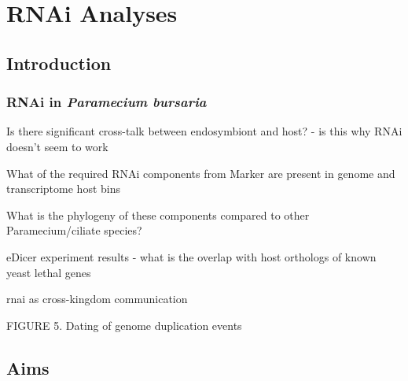 \graphicspath{{chapters/7.Chapter_5/figures}}

\chapter{RNAi Analyses}


\section{Introduction}

\subsection{RNAi in \textit{Paramecium bursaria}}



Is there significant cross-talk between endosymbiont and host? - is this why RNAi doesn't seem to work

What of the required RNAi components from Marker are present in genome and transcriptome host bins

What is the phylogeny of these components compared to other Paramecium/ciliate species?

eDicer experiment results - what is the overlap with host orthologs of known yeast lethal genes

rnai as cross-kingdom communication \citep{Weiberg2015}



FIGURE 5. Dating of genome duplication events





\section{Aims}


